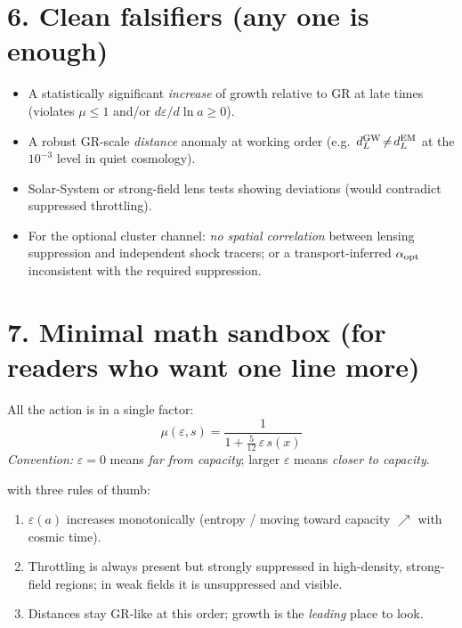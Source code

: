 \documentclass[aps,prd,onecolumn,superscriptaddress,nofootinbib]{revtex4-2}
\newcommand{\eps}{\varepsilon}
\begin{document}
\section*{6. Clean falsifiers (any one is enough)}
\begin{itemize}
\item A statistically significant \emph{increase} of growth relative to GR at late times (violates $\mu\le 1$ and/or $d\eps/d\ln a\ge 0$).
\item A robust GR-scale \emph{distance} anomaly at working order (e.g.\ $d_L^{\rm GW}\!\neq\!d_L^{\rm EM}$ at the $10^{-3}$ level in quiet cosmology).
\item Solar-System or strong-field lens tests showing deviations (would contradict suppressed throttling).
\item For the optional cluster channel: \emph{no spatial correlation} between lensing suppression and independent shock tracers; or a transport-inferred $\alpha_{\rm opt}$ inconsistent with the required suppression.
\end{itemize}

\section*{7. Minimal math sandbox (for readers who want one line more)}
All the action is in a single factor:
\[
\boxed{\quad \mu(\eps,s)=\frac{1}{1+\frac{5}{12}\,\eps\,s(x)} \quad}
\]
\noindent\emph{Convention:} $\varepsilon=0$ means \emph{far from capacity}; larger $\varepsilon$ means \emph{closer to capacity}.

with three rules of thumb:
\begin{enumerate}
\item $\eps(a)$ increases monotonically (entropy / moving toward capacity $\nearrow$ with cosmic time).
\item Throttling is always present but strongly suppressed in high-density, strong-field regions; in weak fields it is unsuppressed and visible.
\item Distances stay GR-like at this order; growth is the \emph{leading} place to look.
\end{enumerate}
\end{document}
